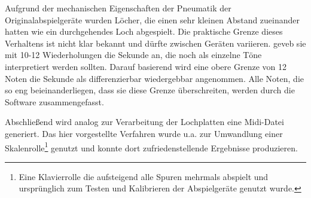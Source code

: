 Aufgrund der mechanischen Eigenschaften der Pneumatik der Originalabspielgeräte wurden Löcher, die einen sehr kleinen Abstand zueinander hatten wie ein durchgehendes Loch abgespielt.
Die praktische Grenze dieses Verhaltens ist nicht klar bekannt und dürfte zwischen Geräten variieren.
\textcite[7]{zoltan_1994} geveb sie mit 10-12 Wiederholungen die Sekunde an, die noch als einzelne Töne interpretiert werden sollten.
Darauf basierend wird eine obere Grenze von 12 Noten die Sekunde als differenzierbar wiedergebbar angenommen.
Alle Noten, die so eng beieinanderliegen, dass sie diese Grenze überschreiten, werden durch die Software zusammengefasst.

Abschließend wird analog zur Verarbeitung der Lochplatten eine Midi-Datei generiert.
Das hier vorgestellte Verfahren wurde u.a. zur Umwandlung einer Skalenrolle\footnote{Eine Klavierrolle die aufsteigend alle Spuren mehrmals abspielt und ursprünglich zum Testen und Kalibrieren der Abspielgeräte genutzt wurde.} genutzt und konnte dort zufriedenstellende Ergebnisse produzieren.
